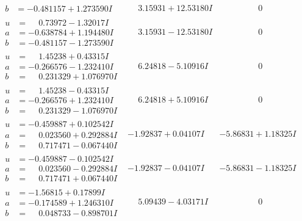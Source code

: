 \documentclass[1p]{elsarticle_modified}
\theoremstyle{definition}
\begin{document}
$$\begin{array}{c|c|c}
\begin{aligned}
b &= -0.481157 + 1.273590 I\end{aligned}
 & \phantom{-}3.15931 + 12.53180 I & \phantom{-0.000000 } 0 \\ \hline\begin{aligned}
u &= \phantom{-}0.73972 - 1.32017 I \\
a &= -0.638784 + 1.194480 I \\
b &= -0.481157 - 1.273590 I\end{aligned}
 & \phantom{-}3.15931 - 12.53180 I & \phantom{-0.000000 } 0 \\ \hline\begin{aligned}
u &= \phantom{-}1.45238 + 0.43315 I \\
a &= -0.266576 - 1.232410 I \\
b &= \phantom{-}0.231329 + 1.076970 I\end{aligned}
 & \phantom{-}6.24818 - 5.10916 I & \phantom{-0.000000 } 0 \\ \hline\begin{aligned}
u &= \phantom{-}1.45238 - 0.43315 I \\
a &= -0.266576 + 1.232410 I \\
b &= \phantom{-}0.231329 - 1.076970 I\end{aligned}
 & \phantom{-}6.24818 + 5.10916 I & \phantom{-0.000000 } 0 \\ \hline\begin{aligned}
u &= -0.459887 + 0.102542 I \\
a &= \phantom{-}0.023560 + 0.292884 I \\
b &= \phantom{-}0.717471 - 0.067440 I\end{aligned}
 & -1.92837 + 0.04107 I & -5.86831 + 1.18325 I \\ \hline\begin{aligned}
u &= -0.459887 - 0.102542 I \\
a &= \phantom{-}0.023560 - 0.292884 I \\
b &= \phantom{-}0.717471 + 0.067440 I\end{aligned}
 & -1.92837 - 0.04107 I & -5.86831 - 1.18325 I \\ \hline\begin{aligned}
u &= -1.56815 + 0.17899 I \\
a &= -0.174589 + 1.246310 I \\
b &= \phantom{-}0.048733 - 0.898701 I\end{aligned}
 & \phantom{-}5.09439 - 4.03171 I & \phantom{-0.000000 } 0 \\ \hline\begin{aligned}

\end{aligned}
\end{array}$$
\end{document}
